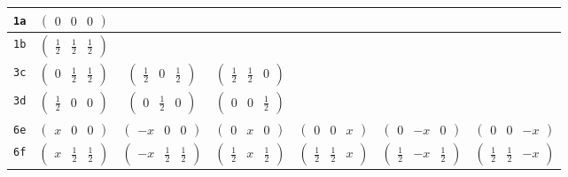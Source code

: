 \documentclass[fleqn,9pt,landscape]{jsarticle}
\begin{document}
\begin{center}
\begin{longtable}{ccccccc}
{\tt 1a} & $ \begin{pmatrix} 0 & 0 & 0 \end{pmatrix} $ & $  $ & $  $ & $  $ & $  $ & $  $ \\ \hline
{\tt 1b} & $ \begin{pmatrix} \frac{1}{2} & \frac{1}{2} & \frac{1}{2} \end{pmatrix} $ & $  $ & $  $ & $  $ & $  $ & $  $ \\ \hline
{\tt 3c} & $ \begin{pmatrix} 0 & \frac{1}{2} & \frac{1}{2} \end{pmatrix} $ & $ \begin{pmatrix} \frac{1}{2} & 0 & \frac{1}{2} \end{pmatrix} $ & $ \begin{pmatrix} \frac{1}{2} & \frac{1}{2} & 0 \end{pmatrix} $ & $  $ & $  $ & $  $ \\ \hline
{\tt 3d} & $ \begin{pmatrix} \frac{1}{2} & 0 & 0 \end{pmatrix} $ & $ \begin{pmatrix} 0 & \frac{1}{2} & 0 \end{pmatrix} $ & $ \begin{pmatrix} 0 & 0 & \frac{1}{2} \end{pmatrix} $ & $  $ & $  $ & $  $ \\ \hline
{\tt 6e} & $ \begin{pmatrix} x & 0 & 0 \end{pmatrix} $ & $ \begin{pmatrix} - x & 0 & 0 \end{pmatrix} $ & $ \begin{pmatrix} 0 & x & 0 \end{pmatrix} $ & $ \begin{pmatrix} 0 & 0 & x \end{pmatrix} $ & $ \begin{pmatrix} 0 & - x & 0 \end{pmatrix} $ & $ \begin{pmatrix} 0 & 0 & - x \end{pmatrix} $ \\ \hline
{\tt 6f} & $ \begin{pmatrix} x & \frac{1}{2} & \frac{1}{2} \end{pmatrix} $ & $ \begin{pmatrix} - x & \frac{1}{2} & \frac{1}{2} \end{pmatrix} $ & $ \begin{pmatrix} \frac{1}{2} & x & \frac{1}{2} \end{pmatrix} $ & $ \begin{pmatrix} \frac{1}{2} & \frac{1}{2} & x \end{pmatrix} $ & $ \begin{pmatrix} \frac{1}{2} & - x & \frac{1}{2} \end{pmatrix} $ & $ \begin{pmatrix} \frac{1}{2} & \frac{1}{2} & - x \end{pmatrix} $ \\ \hline

\end{longtable}
\end{center}
\end{document}
